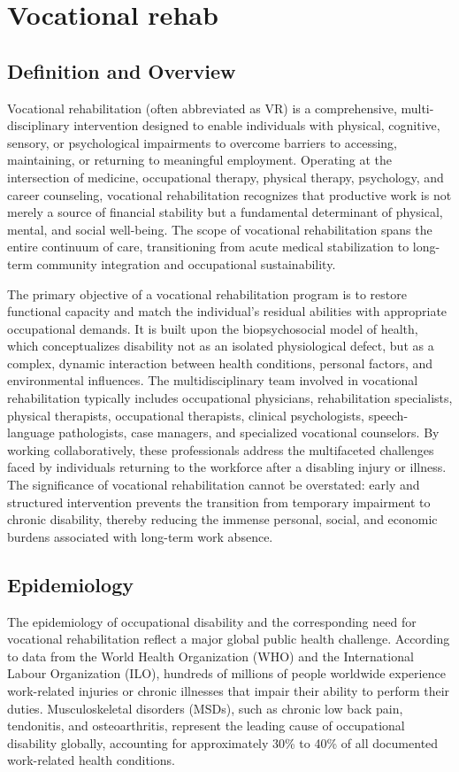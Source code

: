 \chapter{Vocational rehab}

\section*{Definition and Overview}
Vocational rehabilitation (often abbreviated as VR) is a comprehensive, multi-disciplinary intervention designed to enable individuals with physical, cognitive, sensory, or psychological impairments to overcome barriers to accessing, maintaining, or returning to meaningful employment. Operating at the intersection of medicine, occupational therapy, physical therapy, psychology, and career counseling, vocational rehabilitation recognizes that productive work is not merely a source of financial stability but a fundamental determinant of physical, mental, and social well-being. The scope of vocational rehabilitation spans the entire continuum of care, transitioning from acute medical stabilization to long-term community integration and occupational sustainability.

The primary objective of a vocational rehabilitation program is to restore functional capacity and match the individual's residual abilities with appropriate occupational demands. It is built upon the biopsychosocial model of health, which conceptualizes disability not as an isolated physiological defect, but as a complex, dynamic interaction between health conditions, personal factors, and environmental influences. The multidisciplinary team involved in vocational rehabilitation typically includes occupational physicians, rehabilitation specialists, physical therapists, occupational therapists, clinical psychologists, speech-language pathologists, case managers, and specialized vocational counselors. By working collaboratively, these professionals address the multifaceted challenges faced by individuals returning to the workforce after a disabling injury or illness. The significance of vocational rehabilitation cannot be overstated: early and structured intervention prevents the transition from temporary impairment to chronic disability, thereby reducing the immense personal, social, and economic burdens associated with long-term work absence.

\section*{Epidemiology}
The epidemiology of occupational disability and the corresponding need for vocational rehabilitation reflect a major global public health challenge. According to data from the World Health Organization (WHO) and the International Labour Organization (ILO), hundreds of millions of people worldwide experience work-related injuries or chronic illnesses that impair their ability to perform their duties. Musculoskeletal disorders (MSDs), such as chronic low back pain, tendonitis, and osteoarthritis, represent the leading cause of occupational disability globally, accounting for approximately 30\% to 40\% of all documented work-related health conditions.


